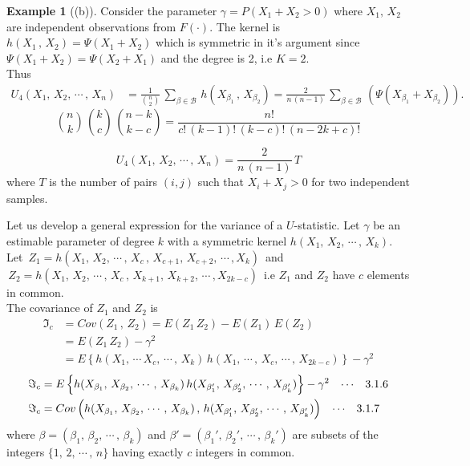 \documentclass[12pt,a4paper]{report}
\theoremstyle{definition}
\newtheorem{exa}[thm]{Example}
\theoremstyle{plain}
\begin{document}
\begin{exa}[(b)]
Consider the parameter $\gamma = P\left(X_1 + X_2>0\right)$ where $X_1, \, X_2\,$ are independent observations from $F(\cdot)$. The kernel is $h(X_1\, , \, X_2) = \Psi(X_1 + X_2)$ which is symmetric in it's argument since $\Psi(X_1 + X_2) = \Psi(X_2 + X_1)$ and the degree is 2, i.e $K = 2$.\\
Thus
\begin{align*}
U_4(X_1,\, X_2,\, \cdots\, , \, X_n)  & = \frac{1}{\binom{n}{2}}\, \sum_{\beta\in\mathcal{B}} \, h\left(X_{\beta_1}\, , \, X_{\beta_2}\right)
 = \frac{2}{n\, (n - 1)}\, \sum_{\beta\in \mathcal{B}}\, \left(\Psi\left(X_{\beta_1}+X_{\beta_2}\right)\right).
\end{align*}
$$\binom{n}{k}\, \binom{k}{c}\, \binom{n - k}{k-c} = \frac{n!}{c!\, (k - 1)!\, (k - c)!\, (n - 2k + c)!}$$

$$U_4(X_1,\, X_2,\, \cdots\, , \, X_n)  = \frac{2}{n\, (n - 1)}\, T$$
where $T$ is the number of pairs $(i,j)$ such that $X_i + X_j > 0$ for two independent samples.
\end{exa}



Let us develop  a general expression for the variance of a $U$-statistic. Let $\gamma$ be an estimable parameter of degree $k$ with a symmetric kernel $h(X_1,\, X_2,\, \cdots\, , \, X_k)$. \\
Let $\,Z_1 = h(X_1, \, X_2, \, \cdots\, , \, X_c\, , \, X_{c + 1}, \, X_{c + 2}, \, \cdots\, , X_k)\,$   and\\
$\,Z_2 = h(X_1, \, X_2, \, \cdots\, , \, X_c\, , \, X_{k + 1}, \, X_{k + 2}, \, \cdots\, , X_{2k-c})\,$ 
i.e $Z_1$ and $Z_2$ have $c$ elements in common.\\

The covariance of $Z_1$ and $Z_2$ is 
\begin{align*}
\Im_c  & = Cov(Z_1\, , \, Z_2) = E(Z_1\, Z_2) - E(Z_1)\, E(Z_2)\\
& = E(Z_1\, Z_2) - \gamma^2\\
& = E\left\{h(X_1,  \, \cdots\, X_c, \, \cdots\,, \, X_k)\, h(X_1, \, \cdots\, , \, X_c, \, \cdots\, , \, X_{2k - c})\right\} - \gamma^2 
\end{align*}
\begin{align*}
\Im_c & = E\left\{h(X_{\beta_1}, \, X_{\beta_2}, \, \cdots\, , \, X_{\beta_k})\, h(X_{\beta_1'}, \, X_{\beta_2'}, \, \cdots\, , \, X_{\beta_k'})\right\} - \gamma^2\hspace{0.3cm}\cdots\hspace{0.3cm} 3.1.6\\
\Im_c & = Cov\left(h(X_{\beta_1}, \, X_{\beta_2}, \, \cdots\, , \, X_{\beta_k})\,,\, h(X_{\beta_1'}, \, X_{\beta_2'}, \, \cdots\, , \, X_{\beta_k'})\right)\hspace{0.3cm}\cdots\hspace{0.3cm} 3.1.7
\end{align*}
where $\beta = (\beta_1, \, \beta_2, \, \cdots\, , \, \beta_k)$ and $\beta' = (\beta_1', \, \beta_2', \, \cdots\, , \, \beta_k')$ are subsets of the integers $\{1, \, 2, \,\cdots\,  ,\, n\}$ having exactly $c$ integers in common.\\
\end{document}
